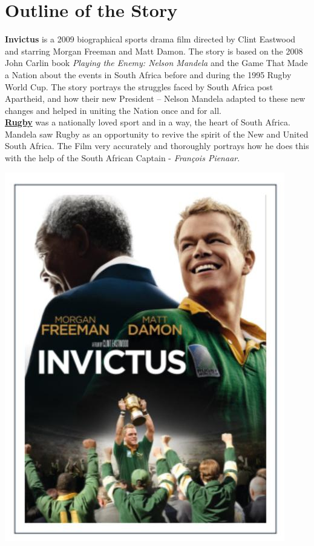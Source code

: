 \documentclass[11pt]{article}
\begin{document}
\tableofcontents
\clearpage
	

\section{Outline of the Story}

\noindent
\begin{minipage}{0.6\textwidth}\raggedright
\textbf{Invictus} is a 2009 biographical sports drama film
directed by Clint Eastwood and starring Morgan
Freeman and Matt Damon. The story is based on
the 2008 John Carlin book \textit{Playing the Enemy:
	Nelson Mandela} and the Game That Made a
Nation about the events in South Africa before
and during the 1995 Rugby World Cup.
The story portrays the struggles faced by South
Africa post Apartheid, and how their new
President – Nelson Mandela adapted to these new
changes and helped in uniting the Nation once and
for all.\\
\underline{\textbf{Rugby}} was a nationally loved sport and in a
way, the heart of South Africa. Mandela saw
Rugby as an opportunity to revive the spirit of
the New and United South Africa.
The Film very accurately and thoroughly
portrays how he does this with the help of the
South African Captain - \textit{François Pienaar}.\\
\vspace{5mm}
\end{minipage}
\hfill%
\begin{minipage}{0.3\textwidth}%
	\includegraphics[width=\linewidth]{cover.jpg}
\end{minipage}\\
\end{document}
